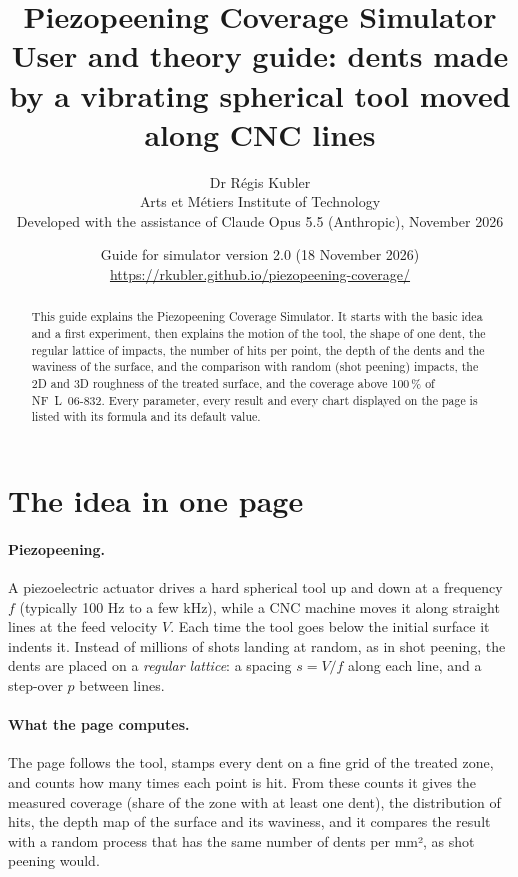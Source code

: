 \documentclass[11pt,a4paper]{article}
\title{\textbf{Piezopeening Coverage Simulator}\\[3pt]
\large User and theory guide: dents made by a vibrating spherical tool moved along CNC lines}
\author{Dr Régis Kubler\\ Arts et Métiers Institute of Technology\\[4pt]
\small Developed with the assistance of Claude Opus 5.5 (Anthropic), November 2026}
\date{Guide for simulator version 2.0 (18 November 2026)\\ \url{https://rkubler.github.io/piezopeening-coverage/}}
\begin{document}
\maketitle
\thispagestyle{fancy}

\begin{abstract}
\noindent This guide explains the Piezopeening Coverage Simulator. It starts with the basic idea and a first experiment, then explains the motion of the tool, the shape of one dent, the regular lattice of impacts, the number of hits per point, the depth of the dents and the waviness of the surface, and the comparison with random (shot peening) impacts, the 2D and 3D roughness of the treated surface, and the coverage above 100\,\% of NF~L~06-832. Every parameter, every result and every chart displayed on the page is listed with its formula and its default value.
\end{abstract}

\tableofcontents

\section{The idea in one page}

\paragraph{Piezopeening.} A piezoelectric actuator drives a hard spherical tool up and down at a frequency $f$ (typically 100 Hz to a few kHz), while a CNC machine moves it along straight lines at the feed velocity $V$. Each time the tool goes below the initial surface it indents it. Instead of millions of shots landing at random, as in shot peening, the dents are placed on a \emph{regular lattice}: a spacing $s=V/f$ along each line, and a step-over $p$ between lines.

\paragraph{What the page computes.} The page follows the tool, stamps every dent on a fine grid of the treated zone, and counts how many times each point is hit. From these counts it gives the measured coverage (share of the zone with at least one dent), the distribution of hits, the depth map of the surface and its waviness, and it compares the result with a random process that has the same number of dents per mm², as shot peening would.
\end{document}

